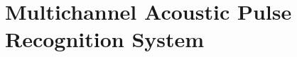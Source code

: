 \chapter{Multichannel Acoustic Pulse Recognition System}

\ifpdf
    \graphicspath{{Chapter4_MultiAPR/Chapter4Figs/PNG/}{Chapter4_MultiAPR/Chapter4Figs/PDF/}{Chapter4_MultiAPR/Chapter4Figs/}}
\else
    \graphicspath{{Chapter4_MultiAPR/Chapter4Figs/EPS/}{Chapter4_MultiAPR/Chapter4Figs/}}
\fi



